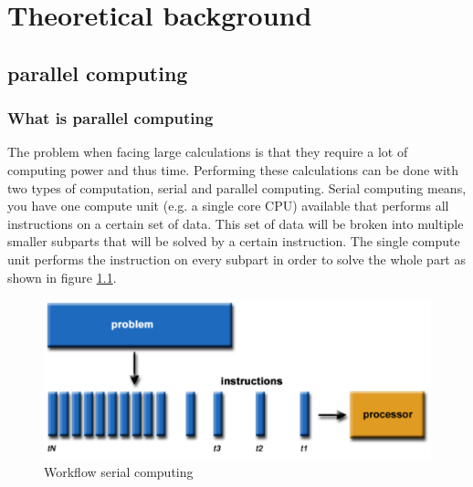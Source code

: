 \documentclass[a4paper, 11pt]{report}
\begin{document}
\chapter{Theoretical background}

\section{parallel computing}
	\subsection{What is parallel computing}
The problem when facing large calculations is that they require a lot of computing power and thus time. Performing these calculations can be done with two types of computation, serial and parallel computing. Serial computing means, you have one compute unit (e.g. a single core CPU) available that performs all instructions on a certain set of data. This set of data will be broken into multiple smaller subparts that will be solved by a certain instruction. The single compute unit performs the instruction on every subpart in order to solve the whole part as shown in figure \ref{fig:SerialC}.
	\begin{figure}[ht]
		\centering
		\includegraphics[scale=.4]{images/serialProblem.pdf}
		\caption{Workflow serial computing}
		\label{fig:SerialC}
	\end{figure}
\end{document}
